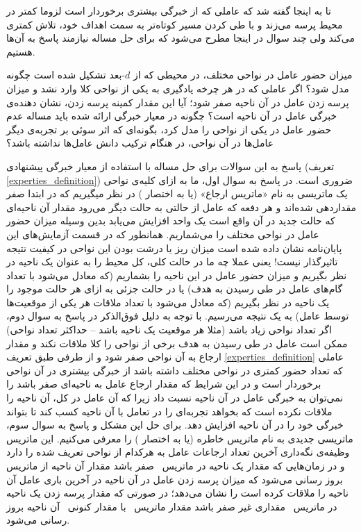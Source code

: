 تا به اینجا گفته شد که عاملی که از خبرگی بیشتری برخوردار است لزوما کمتر در محیط پرسه می‌زند و با طی کردن مسیر کوتاه‌تر به سمت اهداف خود، تلاش کمتری می‌کند ولی چند سوال در اینجا مطرح می‌شود که برای حل مساله نیازمند پاسخ به آن‌ها هستیم.
\begin{enumerate}
 میزان حضور عامل در نواحی مختلف، در محیطی که از $d$-بعد تشکیل شده است چگونه مدل شود؟
 اگر عاملی که در هر چرخه یادگیری به یکی از نواحی کلا وارد نشد و میزان پرسه زدن عامل در آن ناحیه صفر شود؛ آیا این مقدار کمینه پرسه زدن، نشان دهنده‌ی خبرگی عامل در آن ناحیه است؟
 چگونه در معیار خبرگی ارائه شده باید مساله عدم حضور عامل در یکی از نواحی را مدل کرد، بگونه‌ای که اثر سوئی بر تجربه‌ی دیگر عامل‌ها در آن نواحی، در هنگام ترکیب دانش عامل‌ها نداشته باشد؟
\end{enumerate}
پاسخ به این سوالات برای حل مساله با استفاده از معیار خبرگی پیشنهادی (تعریف \ref{experties_definition}) ضروری است. در پاسخ به سوال اول، ما به ازای کلیه‌ی نواحی یک ماتریسی به نام «ماتریس ارجاع» (یا به اختصار ) در نظر میگیریم که در ابتدا صفر مقداردهی شده‌اند و هر دفعه که عامل از حالتی‌ به حالت دیگر می‌رود مقدار آن ناحیه‌ای که حالت جدید در آن واقع است یک واحد افزایش می‌یابد بدین وسیله میزان حضور عامل در نواحی مختلف را می‌شماریم. همانطور که در قسمت آزمایش‌های این پایان‌نامه نشان داده شده است میزان ریز یا درشت بودن این نواحی در کیفیت نتیجه تاثیرگذار نیست! یعنی عملا چه ما در حالت کلی، کل محیط را به عنوان یک ناحیه در نظر بگیریم و میزان حضور عامل در این ناحیه را بشماریم (که معادل می‌شود با تعداد گام‌های عامل در طی رسیدن به هدف) یا در حالت جزئی به ازای هر حالت موجود را یک ناحیه در نظر بگیریم (که معادل می‌شود با تعداد ملاقات هر یکی از موقعیت‌ها توسط عامل) به یک نتیجه می‌رسیم. با توجه به دلیل فوق‌الذکر در پاسخ به سوال دوم، اگر تعداد نواحی زیاد باشد (مثلا هر موقعیت یک ناحیه باشد -- حداکثر تعداد نواحی) ممکن است عامل در طی رسیدن به هدف برخی از نواحی را کلا ملاقات نکند و مقدار ارجاع به آن نواحی صفر شود و از طرفی طبق تعریف \ref{experties_definition} عاملی که تعداد حضور کمتری در نواحی مختلف داشته باشد از خبرگی بیشتری در آن نواحی برخوردار است و در این شرایط که مقدار ارجاع عامل به ناحیه‌ای صفر باشد را نمی‌توان به خبرگی عامل در آن ناحیه نسبت داد زیرا که آن عامل در کل، آن ناحیه را ملاقات نکرده است که بخواهد تجربه‌ای را در تعامل با آن ناحیه کسب کند تا بتواند خبرگی خود را در آن ناحیه افزایش دهد. برای حل این مشکل و پاسخ به سوال سوم، ماتریسی جدیدی به نام ماتریس خاطره (یا به اختصار ) را معرفی می‌کنیم. این ماتریس وظیفه‌ی نگه‌داری آخرین تعداد ارجاعات عامل به هرکدام از نواحی تعریف شده را دارد و در زمان‌هایی که مقدار یک ناحیه در ماتریس \ صفر باشد مقدار آن ناحیه از ماتریس \ بروز رسانی می‌شود که میزان پرسه زدن عامل در آن ناحیه در آخرین باری عامل آن ناحیه را ملاقات کرده است را نشان می‌دهد؛ در صورتی که مقدار پرسه زدن یک ناحیه در ماتریس \ مقداری غیر صفر باشد مقدار ماتریس \ با مقدار کنونی \ آن ناحیه بروز رسانی می‌شود.
